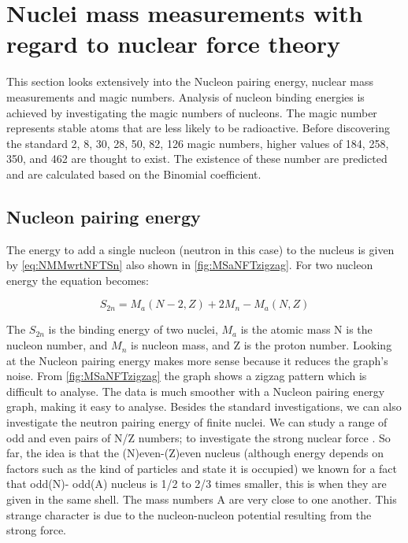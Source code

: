 \section{Nuclei mass measurements with regard to nuclear force theory}
This section looks extensively into the Nucleon pairing energy, nuclear mass measurements and magic numbers.
Analysis of nucleon binding energies is achieved by investigating the magic numbers of nucleons.
The magic number represents stable atoms that are less likely to be radioactive. 
Before discovering the standard 2, 8, 30, 28, 50, 82, 126 magic numbers, higher values of 184, 258, 350, and 462 are thought to exist. 
The existence of these number are predicted and are calculated based on the Binomial coefficient.
\subsection{Nucleon pairing energy}
The energy to add a single nucleon (neutron in this case) to the nucleus is given by \cref{eq:NMMwrtNFTSn} also shown in \cref{fig:MSaNFTzigzag}.
For two nucleon energy the equation becomes:

\begin{equation}\label{eq:NMMwrtNFTSn}
    S_{2n} = M_{a}(N-2,Z) + 2M_{n} - M_{a}(N,Z)
\end{equation}

The $S_{2n}$ is the binding energy of two nuclei, $M_{a}$ is the atomic mass N is the nucleon number, and $M_n$ is nucleon mass, and Z is the proton number.  
Looking at the Nucleon pairing energy makes more sense because it reduces the graph's noise. 
From \cref{fig:MSaNFTzigzag} the graph shows a zigzag pattern which is difficult to analyse. 
The data is much smoother with a Nucleon pairing energy graph, making it easy to analyse.  
Besides the standard investigations, we can also investigate the neutron pairing energy of finite nuclei.
We can study a range of odd and even pairs of N/Z numbers; to investigate the strong nuclear force \cite{fred_neutron_2019}.
So far, the idea is that the (N)even-(Z)even nucleus (although energy depends on factors such as the kind of particles and state it is occupied) we known for a fact that odd(N)- odd(A) nucleus is 1/2 to 2/3 times smaller, this is when they are given in the same shell. The mass numbers A are very close to one another.
This strange character is due to the nucleon-nucleon potential resulting from the strong force. \cite{jensen_elementary_1955}

